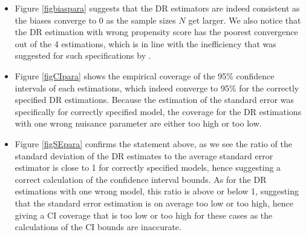 \documentclass[12pt,twoside]{article}
\begin{document}
\begin{itemize}
    \item Figure \ref{figbiaspara} suggests that the DR estimators are indeed consistent as the biases converge to 0 as the sample sizes $N$ get larger. We also notice that the DR estimation with wrong propensity score has the poorest convergence out of the 4 estimations, which is in line with the inefficiency that was suggested for such specifications by \citet{kang}.
    \item Figure \ref{figCIpara} shows the empirical coverage of the 95\% confidence intervals of each estimations, which indeed converge to 95\% for the correctly specified DR estimations. Because the estimation of the standard error was specifically for correctly specified model, the coverage for the DR estimations with one wrong nuisance parameter are either too high or too low.
    \item Figure \ref{figSEpara} confirms the statement above, as we see the ratio of the standard deviation of the DR estimates to the average standard error estimator is close to 1 for correctly specified models, hence suggesting a correct calculation of the confidence interval bounds. As for the DR estimations with one wrong model, this ratio is above or below 1, suggesting that the standard error estimation is on average too low or too high, hence giving a CI coverage that is too low or too high for these cases as the calculations of the CI bounds are inaccurate.
\end{itemize}
\end{document}

